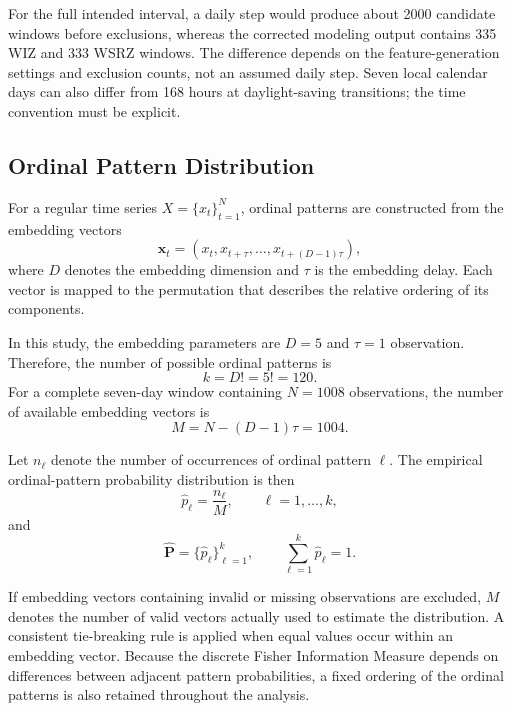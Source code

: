 \documentclass[11pt,a4paper]{article}
\begin{document}
For the full intended interval, a daily step would produce about 2000 candidate windows before exclusions, whereas the corrected modeling output contains 335 WIZ and 333 WSRZ windows. The difference depends on the feature-generation settings and exclusion counts, not an assumed daily step. Seven local calendar days can also differ from 168 hours at daylight-saving transitions; the time convention must be explicit. 


\subsection{Ordinal Pattern Distribution}

For a regular time series $X=\{x_t\}_{t=1}^{N}$, ordinal patterns are constructed from the embedding vectors
\begin{equation}
	\mathbf{x}_t =
	(x_t,x_{t+\tau},\ldots,x_{t+(D-1)\tau}),
\end{equation}
where $D$ denotes the embedding dimension and $\tau$ is the embedding delay. Each vector is mapped to the permutation that describes the relative ordering of its components.

In this study, the embedding parameters are $D=5$ and $\tau=1$ observation. Therefore, the number of possible ordinal patterns is
\begin{equation}
	k=D!=5!=120.
\end{equation}
For a complete seven-day window containing $N=1008$ observations, the number of available embedding vectors is
\begin{equation}
	M=N-(D-1)\tau=1004.
\end{equation}

Let $n_\ell$ denote the number of occurrences of ordinal pattern $\ell$. The empirical ordinal-pattern probability distribution is then
\begin{equation}
	\widehat{p}_\ell=\frac{n_\ell}{M},
	\qquad
	\ell=1,\ldots,k,
\end{equation}
and
\begin{equation}
	\widehat{\mathbf{P}}
	=
	\{\widehat{p}_\ell\}_{\ell=1}^{k},
	\qquad
	\sum_{\ell=1}^{k}\widehat{p}_\ell=1.
\end{equation}

If embedding vectors containing invalid or missing observations are excluded, $M$ denotes the number of valid vectors actually used to estimate the distribution. A consistent tie-breaking rule is applied when equal values occur within an embedding vector. Because the discrete Fisher Information Measure depends on differences between adjacent pattern probabilities, a fixed ordering of the ordinal patterns is also retained throughout the analysis.
\end{document}
